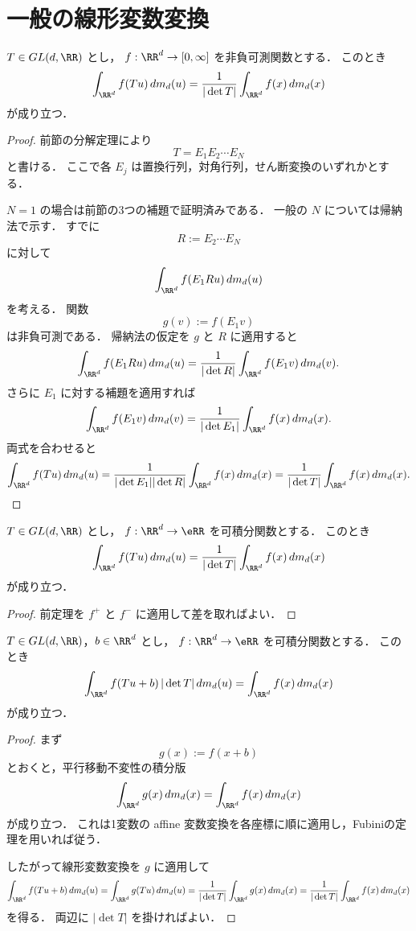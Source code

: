 \section{一般の線形変数変換}

\begin{theorem}[線形変数変換]
$T\in GL(d,\RR)$ とし，
$f:\RR^d\to[0,\infty]$ を非負可測関数とする．
このとき
\[
\int_{\RR^d}f(Tu)\,dm_d(u)
=
\frac{1}{|\det T|}\int_{\RR^d}f(x)\,dm_d(x)
\]
が成り立つ．
\end{theorem}
\begin{proof}
前節の分解定理により
\[
T=E_1E_2\cdots E_N
\]
と書ける．
ここで各 $E_j$ は置換行列，対角行列，せん断変換のいずれかとする．

$N=1$ の場合は前節の3つの補題で証明済みである．
一般の $N$ については帰納法で示す．
すでに
\[
R:=E_2\cdots E_N
\]
に対して
\[
\int_{\RR^d}f(E_1Ru)\,dm_d(u)
\]
を考える．
関数
\[
g(v):=f(E_1v)
\]
は非負可測である．
帰納法の仮定を $g$ と $R$ に適用すると
\[
\int_{\RR^d}f(E_1Ru)\,dm_d(u)
=
\frac{1}{|\det R|}\int_{\RR^d}f(E_1v)\,dm_d(v).
\]
さらに $E_1$ に対する補題を適用すれば
\[
\int_{\RR^d}f(E_1v)\,dm_d(v)
=
\frac{1}{|\det E_1|}\int_{\RR^d}f(x)\,dm_d(x).
\]
両式を合わせると
\[
\int_{\RR^d}f(Tu)\,dm_d(u)
=
\frac{1}{|\det E_1||\det R|}\int_{\RR^d}f(x)\,dm_d(x)
=
\frac{1}{|\det T|}\int_{\RR^d}f(x)\,dm_d(x).
\]
\end{proof}

\begin{corollary}[可積分関数に対する線形変数変換]
$T\in GL(d,\RR)$ とし，
$f:\RR^d\to\eRR$ を可積分関数とする．
このとき
\[
\int_{\RR^d}f(Tu)\,dm_d(u)
=
\frac{1}{|\det T|}\int_{\RR^d}f(x)\,dm_d(x)
\]
が成り立つ．
\end{corollary}
\begin{proof}
前定理を $f^+$ と $f^-$ に適用して差を取ればよい．
\end{proof}

\begin{corollary}
$T\in GL(d,\RR)$，$b\in\RR^d$ とし，
$f:\RR^d\to\eRR$ を可積分関数とする．
このとき
\[
\int_{\RR^d}f(Tu+b)\,|\det T|\,dm_d(u)
=
\int_{\RR^d}f(x)\,dm_d(x)
\]
が成り立つ．
\end{corollary}
\begin{proof}
まず
\[
g(x):=f(x+b)
\]
とおくと，平行移動不変性の積分版
\[
\int_{\RR^d}g(x)\,dm_d(x)=\int_{\RR^d}f(x)\,dm_d(x)
\]
が成り立つ．
これは1変数の affine 変数変換を各座標に順に適用し，Fubiniの定理を用いれば従う．

したがって線形変数変換を $g$ に適用して
\[
\int_{\RR^d}f(Tu+b)\,dm_d(u)
=
\int_{\RR^d}g(Tu)\,dm_d(u)
=
\frac1{|\det T|}\int_{\RR^d}g(x)\,dm_d(x)
=
\frac1{|\det T|}\int_{\RR^d}f(x)\,dm_d(x)
\]
を得る．
両辺に $|\det T|$ を掛ければよい．
\end{proof}

